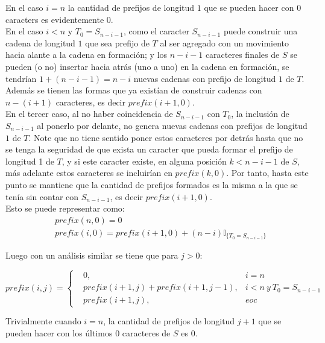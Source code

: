 \documentclass[a4paper]{article}
\begin{document}
    En el caso $i = n$ la cantidad de prefijos de longitud $1$ que se pueden hacer con $0$ caracters es evidentemente $0$.\\
    
    En el caso $i < n$ y $T_0=S_{n-i-1}$, como el caracter $S_{n-i-1}$ puede construir una cadena de longitud $1$ que sea prefijo de $T$ al ser agregado con un movimiento hacia alante a la cadena en formaci\'on; y 
    los $n-i-1$ caracteres finales de $S$ se pueden (o no) insertar hacia atr\'as (uno a uno) en la cadena en formaci\'on, se tendr\'ian $1 + (n-i-1) = n-i$ nuevas cadenas con prefijo de longitud $1$ de $T$.
    Adem\'as
    se tienen las formas que ya exist\'ian de construir cadenas con $n-(i+1)$ caracteres, es decir $prefix(i+1, 0)$.\\ 

    En el tercer caso, al no haber coincidencia de $S_{n-i-1}$ con $T_0$, la inclusi\'on de $S_{n-i-1}$ al ponerlo por delante, no genera nuevas cadenas con prefijos de longitud $1$ de $T$.
    Note que no tiene sentido poner estos caracteres por detr\'as hasta que no se tenga la seguridad
    de que exista un caracter que pueda formar el prefijo de longitud 1 de $T$, y si este caracter existe,
    en alguna posici\'on $k < n-i-1$ de $S$,
    m\'as adelante estos caracteres se incluir\'ian en $prefix(k, 0)$.
    Por tanto, hasta este punto se 
    mantiene que la cantidad de prefijos formados es la misma a la que se ten\'ia sin contar con $S_{n-i-1}$, es decir $prefix(i+1,0)$.\\
    
    Esto se puede representar como:
    $$
    \begin{aligned}
        &prefix(n,0) = 0\\
        &prefix(i,0) = prefix(i+1,0) + (n-i)\mathbb{I}_{\{ T_0 = S_{n-i-1}\}}
    \end{aligned}
    $$

    Luego con un an\'alisis similar se tiene que para $j > 0$:

    $$prefix(i,j) = \left\{ \begin{aligned}
        &0,& i = n \\
        & prefix(i+1,j) + prefix(i+1,j-1),& i < n~ y~ T_0=S_{n-i-1} \\
        &prefix(i+1,j), & eoc
    \end{aligned}\right.$$ 

    Trivialmente cuando $i=n$, la cantidad de prefijos de longitud $j+1$
    que se pueden hacer con los \'ultimos $0$ caracteres de $S$ es $0$.
\end{document}
